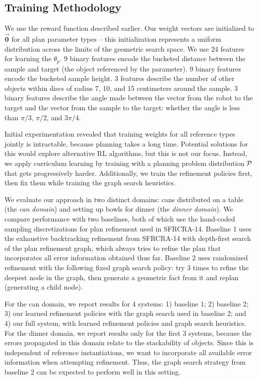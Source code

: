\subsection{Training Methodology}
We use the reward function described earlier. Our weight
vectors are initialized to $\vec{\mathbf{0}}$ for all plan parameter types -- this
initialization represents a uniform distribution across the limits of the geometric search space.
We use 24 features for learning the $\theta_{p}$. 9 binary features encode the bucketed distance between the sample
and target (the object referenced by the parameter). 9 binary features encode the bucketed sample height. 3 features
describe the number of other objects within discs of radius 7, 10, and 15 centimeters around the
sample. 3 binary features describe the angle made between the vector from the
robot to the target and the vector from the sample to the target: whether the angle is less than
$\pi/3$, $\pi/2$, and $3\pi/4$.

Initial experimentation revealed that training weights for all reference types jointly is intractable,
because planning takes a long time. Potential solutions for this would explore alternative RL algorithms,
but this is not our focus. Instead, we apply curriculum learning by training with a planning problem distribution
$\mathcal{P}$ that gets progressively harder. Additionally, we train the refinement policies first, then fix them while
training the graph search heuristics.

We evaluate our approach in two distinct domains: cans distributed on a table (the \emph{can domain})
and setting up bowls for dinner (the \emph{dinner domain}).
We compare performance with two baselines, both of which use the hand-coded sampling discretizations for
plan refinement used in SFRCRA-14. Baseline 1 uses the exhaustive backtracking refinement
from SFRCRA-14 with depth-first search of the plan refinement graph, which always tries to refine
the plan that incorporates all error information obtained thus far.
Baseline 2 uses randomized refinement with the following fixed graph search policy: try 3 times to refine the deepest
node in the graph, then generate a geometric fact from it and replan (generating a child node).

For the can domain, we report results for 4 systems: 1) baseline 1; 2) baseline 2; 3) our learned refinement policies
with the graph search used in baseline 2; and 4) our full system, with learned refinement policies and graph search heuristics.
For the dinner domain, we report results only for the first 3 systems, because the errors propagated in this
domain relate to the stackability of objects. Since this is independent of reference instantiations, we want to
incorporate all available error information when attempting refinement. Thus, the graph search strategy
from baseline 2 can be expected to perform well in this setting.

